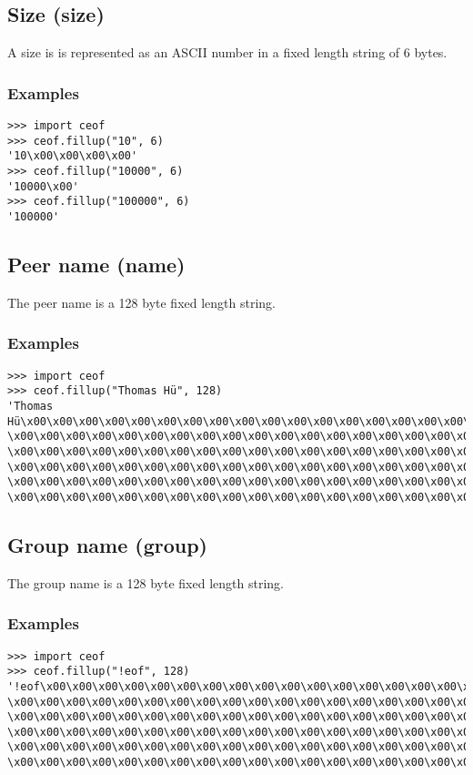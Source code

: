 \subsection{Size (size)}
A size is is represented as an ASCII number in a fixed length
string of 6 bytes.
\subsubsection{Examples}
\begin{verbatim}
>>> import ceof
>>> ceof.fillup("10", 6)
'10\x00\x00\x00\x00'
>>> ceof.fillup("10000", 6)
'10000\x00'
>>> ceof.fillup("100000", 6)
'100000'
\end{verbatim}
\subsection{Peer name (name)}
The peer name is a 128 byte fixed length string.
\subsubsection{Examples}
\begin{verbatim}
>>> import ceof
>>> ceof.fillup("Thomas Hü", 128)
'Thomas Hü\x00\x00\x00\x00\x00\x00\x00\x00\x00\x00\x00\x00\x00\x00\x00\x00\x00\x00
\x00\x00\x00\x00\x00\x00\x00\x00\x00\x00\x00\x00\x00\x00\x00\x00\x00\x00\x00\x00
\x00\x00\x00\x00\x00\x00\x00\x00\x00\x00\x00\x00\x00\x00\x00\x00\x00\x00\x00\x00
\x00\x00\x00\x00\x00\x00\x00\x00\x00\x00\x00\x00\x00\x00\x00\x00\x00\x00\x00\x00
\x00\x00\x00\x00\x00\x00\x00\x00\x00\x00\x00\x00\x00\x00\x00\x00\x00\x00\x00\x00
\x00\x00\x00\x00\x00\x00\x00\x00\x00\x00\x00\x00\x00\x00\x00\x00\x00\x00\x00\x00\x00'
\end{verbatim}
\subsection{Group name (group)}
The group name is a 128 byte fixed length string.
\subsubsection{Examples}
\begin{verbatim}
>>> import ceof
>>> ceof.fillup("!eof", 128)
'!eof\x00\x00\x00\x00\x00\x00\x00\x00\x00\x00\x00\x00\x00\x00\x00\x00\x00\x00\x00\x00
\x00\x00\x00\x00\x00\x00\x00\x00\x00\x00\x00\x00\x00\x00\x00\x00\x00\x00\x00\x00\x00
\x00\x00\x00\x00\x00\x00\x00\x00\x00\x00\x00\x00\x00\x00\x00\x00\x00\x00\x00\x00\x00
\x00\x00\x00\x00\x00\x00\x00\x00\x00\x00\x00\x00\x00\x00\x00\x00\x00\x00\x00\x00\x00
\x00\x00\x00\x00\x00\x00\x00\x00\x00\x00\x00\x00\x00\x00\x00\x00\x00\x00\x00\x00\x00
\x00\x00\x00\x00\x00\x00\x00\x00\x00\x00\x00\x00\x00\x00\x00\x00\x00\x00\x00\x00'
\end{verbatim}

